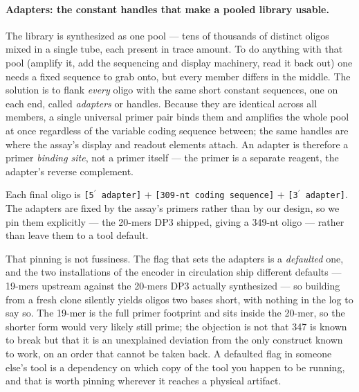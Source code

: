 \paragraph{Adapters: the constant handles that make a pooled library usable.} The library is
synthesized as one pool --- tens of thousands of distinct oligos mixed in a single tube, each present
in trace amount. To do anything with that pool (amplify it, add the sequencing and display machinery,
read it back out) one needs a fixed sequence to grab onto, but every member differs in the middle.
The solution is to flank \emph{every} oligo with the same short constant sequences, one on each end,
called \emph{adapters} or handles. Because they are identical across all members, a single universal
primer pair binds them and amplifies the whole pool at once regardless of the variable coding sequence
between; the same handles are where the assay's display and readout elements attach. An adapter is
therefore a primer \emph{binding site}, not a primer itself --- the primer is a separate reagent, the
adapter's reverse complement.

Each final oligo is \texttt{[5\({}^\prime\) adapter]} $+$ \texttt{[309-nt coding sequence]} $+$
\texttt{[3\({}^\prime\) adapter]}. The adapters are fixed by the assay's primers rather than by our
design, so we pin them explicitly --- the \num{20}-mers DP3 shipped, giving a \num{349}-nt oligo ---
rather than leave them to a tool default.

That pinning is not fussiness. The flag that sets the adapters is a \emph{defaulted} one, and the two
installations of the encoder in circulation ship different defaults --- \num{19}-mers upstream against
the \num{20}-mers DP3 actually synthesized --- so building from a fresh clone silently yields oligos two
bases short, with nothing in the log to say so. The \num{19}-mer is the full primer footprint and sits
inside the \num{20}-mer, so the shorter form would very likely still prime; the objection is not that
\num{347} is known to break but that it is an unexplained deviation from the only construct known to
work, on an order that cannot be taken back. A defaulted flag in someone else's tool is a dependency on
which copy of the tool you happen to be running, and that is worth pinning wherever it reaches a physical
artifact.

